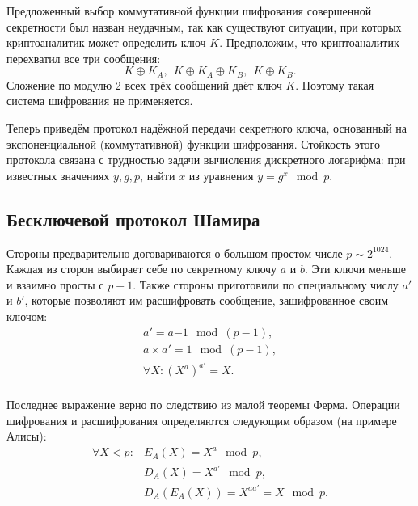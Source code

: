 Предложенный выбор коммутативной функции шифрования совершенной секретности был назван неудачным, так как существуют ситуации, при которых криптоаналитик может определить ключ $K$. Предположим, что криптоаналитик перехватил все три сообщения:
    \[ K \oplus K_A, ~~ K \oplus K_A \oplus K_B, ~~ K \oplus K_B. \]
Сложение по модулю 2 всех трёх сообщений даёт ключ $K$. Поэтому такая система шифрования не применяется.

Теперь приведём протокол надёжной передачи секретного ключа, основанный на экспоненциальной (коммутативной) функции шифрования. Стойкость этого протокола связана с трудностью задачи вычисления дискретного логарифма: при известных значениях $y, g, p$, найти $x$ из уравнения $y = g^x \mod p$.

\subsection{Бесключевой протокол Шамира}

Стороны предварительно договариваются о большом простом числе $p \sim 2^{1024}$. Каждая из сторон выбирает себе по секретному ключу $a$ и $b$. Эти ключи меньше и взаимно просты с $p-1$. Также стороны приготовили по специальному числу $a'$ и $b'$, которые позволяют им расшифровать сообщение, зашифрованное своим ключом:
\[\begin{array}{l}
a' = a{-1} \mod (p-1), \\
a \times a' = 1 \mod (p-1), \\
\forall X: (X^a)^{a'} = X. \\
\end{array}\]

Последнее выражение верно по следствию из малой теоремы Ферма. Операции шифрования и расшифрования определяются следующим образом (на примере Алисы):
\[\begin{array}{ll}
\forall X < p:	& E_A( X ) = X^{a} \mod p, \\
		& D_A( X ) = X^{a'} \mod p, \\
		& D_A( E_A( X ) ) = X^{aa'} = X \mod p. \\
\end{array}\]

